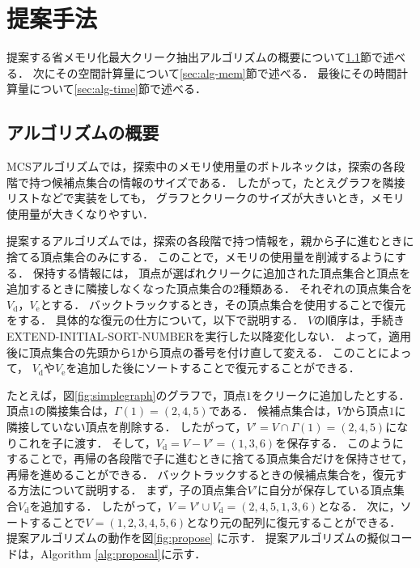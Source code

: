\chapter{提案手法}
\label{ch:propose}

提案する省メモリ化最大クリーク抽出アルゴリズムの概要について\ref{sec:alg-overview}節で述べる．
次にその空間計算量について\ref{sec:alg-mem}節で述べる．
最後にその時間計算量について\ref{sec:alg-time}節で述べる．


\section{アルゴリズムの概要}
\label{sec:alg-overview}
MCSアルゴリズムでは，探索中のメモリ使用量のボトルネックは，探索の各段階で持つ候補点集合の情報のサイズである．
したがって，たとえグラフを隣接リストなどで実装をしても，
グラフとクリークのサイズが大きいとき，メモリ使用量が大きくなりやすい．

提案するアルゴリズムでは，探索の各段階で持つ情報を，親から子に進むときに捨てる頂点集合のみにする．
このことで，メモリの使用量を削減するようにする．
保持する情報には，
頂点が選ばれクリークに追加された頂点集合と頂点を追加するときに隣接しなくなった頂点集合の2種類ある．
それぞれの頂点集合を$V_\mathrm{d}$，$V_\mathrm{e}$とする．
バックトラックするとき，その頂点集合を使用することで復元をする．
具体的な復元の仕方について，以下で説明する．
$V$の順序は，手続きEXTEND-INITIAL-SORT-NUMBERを実行した以降変化しない．
よって，適用後に頂点集合の先頭から1から頂点の番号を付け直して変える．
このことによって，
$V_\mathrm{d}$や$V_\mathrm{e}$を追加した後にソートすることで復元することができる．

たとえば，図\ref{fig:simplegraph}のグラフで，頂点$1$をクリークに追加したとする．
頂点$1$の隣接集合は，$\Gamma(1) = (2,4,5)$である．
候補点集合は，$V$から頂点$1$に隣接していない頂点を削除する．
したがって，$V' = V \cap \Gamma(1) = (2,4,5)$になりこれを子に渡す．
そして，$ V_\mathrm{d} = V-V' = ( 1,3,6 )$を保存する．
このようにすることで，再帰の各段階で子に進むときに捨てる頂点集合だけを保持させて，再帰を進めることができる．
バックトラックするときの候補点集合を，復元する方法について説明する．
まず，子の頂点集合$V'$に自分が保存している頂点集合$V_\mathrm{d}$を追加する．
したがって，$V = V' \cup V_\mathrm{d} = ( 2,4,5,1,3,6)$となる．
次に，ソートすることで$V=(1,2,3,4,5,6)$となり元の配列に復元することができる．
提案アルゴリズムの動作を図\ref{fig:propose}
に示す．
提案アルゴリズムの擬似コードは，Algorithm \ref{alg:proposal}に示す．


